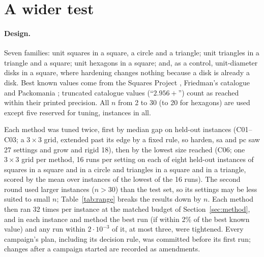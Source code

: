 \section{A wider test}\label{sec:breadth}
\paragraph{Design.} Seven families: unit squares in a square, a circle and a triangle; unit triangles in a triangle and a square; unit hexagons in a square; and, as a control, unit-diameter disks in a square, where hardening changes nothing because a disk is already a disk. Best known values come from the Squares Project \cite{squaresproject}, Friedman's catalogue \cite{friedmancenter} and Packomania \cite{packomania}; truncated catalogue values (``$2.956+$'') count as reached within their printed precision. All $n$ from 2 to 30 (to 20 for hexagons) are used except five reserved for tuning, \CsevenInstances{} instances in all.

Each method was tuned twice, first by median gap on held-out instances (C01--C03; a $3\times3$ grid, extended past its edge by a fixed rule, so harden, sa and pc saw 27 settings and grow and rigid 18), then by the lowest size reached (C06; one $3\times3$ grid per method, 16 runs per setting on each of eight held-out instances of squares in a square and in a circle and triangles in a square and in a triangle, scored by the mean over instances of the lowest of the 16 runs). The second round used larger instances ($n>30$) than the test set, so its settings may be less suited to small $n$; Table~\ref{tab:range} breaks the results down by $n$. Each method then ran 32 times per instance at the matched budget of Section~\ref{sec:method}, and in each instance and method the best run (if within 2\% of the best known value) and any run within $2\cdot10^{-3}$ of it, at most three, were tightened. Every campaign's plan, including its decision rule, was committed before its first run; changes after a campaign started are recorded as amendments.


